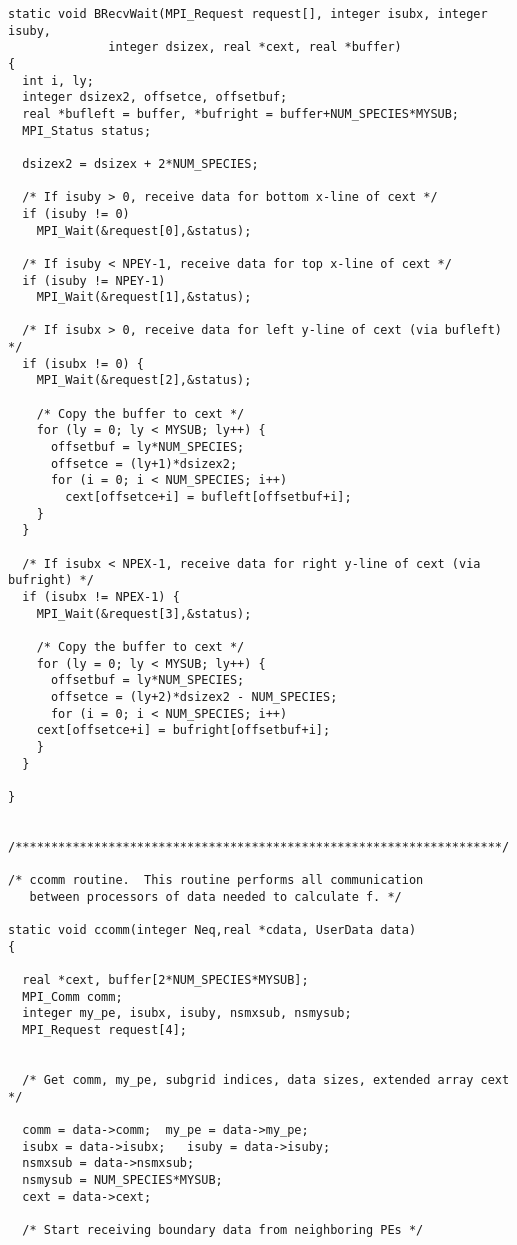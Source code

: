 \begin{verbatim}
static void BRecvWait(MPI_Request request[], integer isubx, integer isuby,
		      integer dsizex, real *cext, real *buffer)
{
  int i, ly;
  integer dsizex2, offsetce, offsetbuf;
  real *bufleft = buffer, *bufright = buffer+NUM_SPECIES*MYSUB;
  MPI_Status status;

  dsizex2 = dsizex + 2*NUM_SPECIES;

  /* If isuby > 0, receive data for bottom x-line of cext */
  if (isuby != 0)
    MPI_Wait(&request[0],&status);

  /* If isuby < NPEY-1, receive data for top x-line of cext */
  if (isuby != NPEY-1)
    MPI_Wait(&request[1],&status);

  /* If isubx > 0, receive data for left y-line of cext (via bufleft) */
  if (isubx != 0) {
    MPI_Wait(&request[2],&status);

    /* Copy the buffer to cext */
    for (ly = 0; ly < MYSUB; ly++) {
      offsetbuf = ly*NUM_SPECIES;
      offsetce = (ly+1)*dsizex2;
      for (i = 0; i < NUM_SPECIES; i++)
        cext[offsetce+i] = bufleft[offsetbuf+i];
    }
  }

  /* If isubx < NPEX-1, receive data for right y-line of cext (via bufright) */
  if (isubx != NPEX-1) {
    MPI_Wait(&request[3],&status);

    /* Copy the buffer to cext */
    for (ly = 0; ly < MYSUB; ly++) {
      offsetbuf = ly*NUM_SPECIES;
      offsetce = (ly+2)*dsizex2 - NUM_SPECIES;
      for (i = 0; i < NUM_SPECIES; i++)
	cext[offsetce+i] = bufright[offsetbuf+i];
    }
  }

}


/********************************************************************/

/* ccomm routine.  This routine performs all communication 
   between processors of data needed to calculate f. */

static void ccomm(integer Neq,real *cdata, UserData data)
{

  real *cext, buffer[2*NUM_SPECIES*MYSUB];
  MPI_Comm comm;
  integer my_pe, isubx, isuby, nsmxsub, nsmysub;
  MPI_Request request[4];


  /* Get comm, my_pe, subgrid indices, data sizes, extended array cext */

  comm = data->comm;  my_pe = data->my_pe;
  isubx = data->isubx;   isuby = data->isuby;
  nsmxsub = data->nsmxsub;
  nsmysub = NUM_SPECIES*MYSUB;
  cext = data->cext;

  /* Start receiving boundary data from neighboring PEs */


\end{verbatim}
